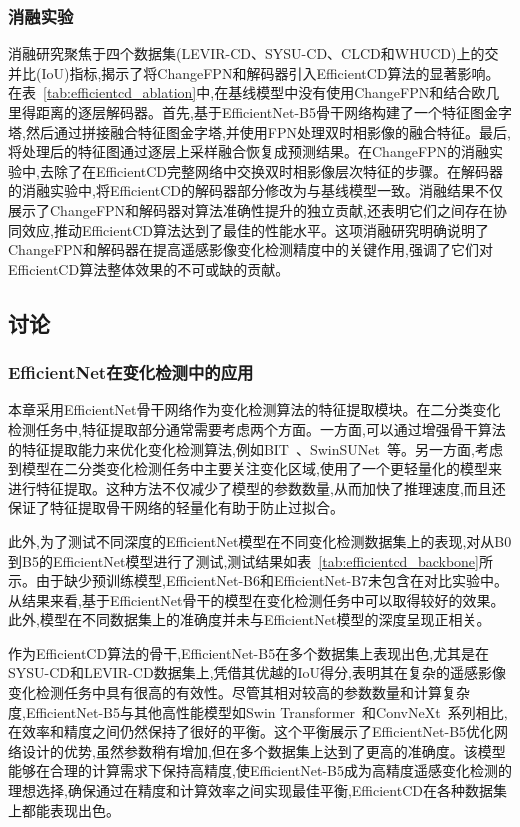 \subsubsection{消融实验}

消融研究聚焦于四个数据集(LEVIR-CD、SYSU-CD、CLCD和WHUCD)上的交并比(IoU)指标,揭示了将ChangeFPN和解码器引入EfficientCD算法的显著影响。在表~\ref{tab:efficientcd_ablation}中,在基线模型中没有使用ChangeFPN和结合欧几里得距离的逐层解码器。首先,基于EfficientNet-B5骨干网络构建了一个特征图金字塔,然后通过拼接融合特征图金字塔,并使用FPN处理双时相影像的融合特征。最后,将处理后的特征图通过逐层上采样融合恢复成预测结果。在ChangeFPN的消融实验中,去除了在EfficientCD完整网络中交换双时相影像层次特征的步骤。在解码器的消融实验中,将EfficientCD的解码器部分修改为与基线模型一致。消融结果不仅展示了ChangeFPN和解码器对算法准确性提升的独立贡献,还表明它们之间存在协同效应,推动EfficientCD算法达到了最佳的性能水平。这项消融研究明确说明了ChangeFPN和解码器在提高遥感影像变化检测精度中的关键作用,强调了它们对EfficientCD算法整体效果的不可或缺的贡献。

\subsection{讨论}

\subsubsection{EfficientNet在变化检测中的应用}

本章采用EfficientNet骨干网络作为变化检测算法的特征提取模块。在二分类变化检测任务中,特征提取部分通常需要考虑两个方面。一方面,可以通过增强骨干算法的特征提取能力来优化变化检测算法,例如BIT~\cite{chen_remote_2022}、SwinSUNet~\cite{Zhang2022SwinSUNetPT}等。另一方面,考虑到模型在二分类变化检测任务中主要关注变化区域,使用了一个更轻量化的模型来进行特征提取。这种方法不仅减少了模型的参数数量,从而加快了推理速度,而且还保证了特征提取骨干网络的轻量化有助于防止过拟合。

此外,为了测试不同深度的EfficientNet模型在不同变化检测数据集上的表现,对从B0到B5的EfficientNet模型进行了测试,测试结果如表~\ref{tab:efficientcd_backbone}所示。由于缺少预训练模型,EfficientNet-B6和EfficientNet-B7未包含在对比实验中。从结果来看,基于EfficientNet骨干的模型在变化检测任务中可以取得较好的效果。此外,模型在不同数据集上的准确度并未与EfficientNet模型的深度呈现正相关。

作为EfficientCD算法的骨干,EfficientNet-B5在多个数据集上表现出色,尤其是在SYSU-CD和LEVIR-CD数据集上,凭借其优越的IoU得分,表明其在复杂的遥感影像变化检测任务中具有很高的有效性。尽管其相对较高的参数数量和计算复杂度,EfficientNet-B5与其他高性能模型如Swin Transformer~\cite{Liu2021SwinTH}和ConvNeXt~\cite{Liu2022ACF}系列相比,在效率和精度之间仍然保持了很好的平衡。这个平衡展示了EfficientNet-B5优化网络设计的优势,虽然参数稍有增加,但在多个数据集上达到了更高的准确度。该模型能够在合理的计算需求下保持高精度,使EfficientNet-B5成为高精度遥感变化检测的理想选择,确保通过在精度和计算效率之间实现最佳平衡,EfficientCD在各种数据集上都能表现出色。

